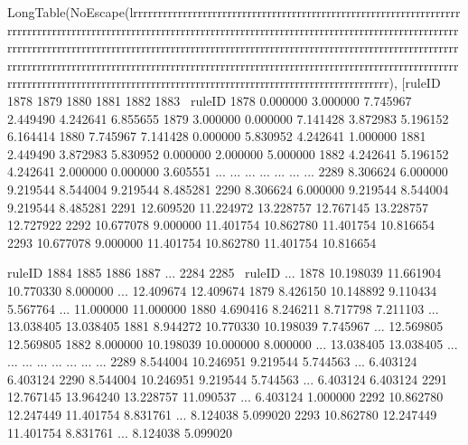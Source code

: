 LongTable(NoEscape(lrrrrrrrrrrrrrrrrrrrrrrrrrrrrrrrrrrrrrrrrrrrrrrrrrrrrrrrrrrrrrrrrrrrrrrrrrrrrrrrrrrrrrrrrrrrrrrrrrrrrrrrrrrrrrrrrrrrrrrrrrrrrrrrrrrrrrrrrrrrrrrrrrrrrrrrrrrrrrrrrrrrrrrrrrrrrrrrrrrrrrrrrrrrrrrrrrrrrrrrrrrrrrrrrrrrrrrrrrrrrrrrrrrrrrrrrrrrrrrrrrrrrrrrrrrrrrrrrrrrrrrrrrrrrrrrrrrrrrrrrrrrrrrrrrrrrrrrrrrrrrrrrrrrrrrrrrrrrrrrrrrrrrrrrrrrrrrrrrrrrrrrrrrrrrrrrrrrrrrrrrrrrrrrrrrrrrrrrrrrrrrrrrrrrrrrrrrrrrrrrrrrrrrrrrrrrrrrr), [ruleID       1878       1879       1880       1881       1882       1883  \
ruleID                                                                     
1878     0.000000   3.000000   7.745967   2.449490   4.242641   6.855655   
1879     3.000000   0.000000   7.141428   3.872983   5.196152   6.164414   
1880     7.745967   7.141428   0.000000   5.830952   4.242641   1.000000   
1881     2.449490   3.872983   5.830952   0.000000   2.000000   5.000000   
1882     4.242641   5.196152   4.242641   2.000000   0.000000   3.605551   
...           ...        ...        ...        ...        ...        ...   
2289     8.306624   6.000000   9.219544   8.544004   9.219544   8.485281   
2290     8.306624   6.000000   9.219544   8.544004   9.219544   8.485281   
2291    12.609520  11.224972  13.228757  12.767145  13.228757  12.727922   
2292    10.677078   9.000000  11.401754  10.862780  11.401754  10.816654   
2293    10.677078   9.000000  11.401754  10.862780  11.401754  10.816654   

ruleID       1884       1885       1886       1887  ...       2284       2285  \
ruleID                                              ...                         
1878    10.198039  11.661904  10.770330   8.000000  ...  12.409674  12.409674   
1879     8.426150  10.148892   9.110434   5.567764  ...  11.000000  11.000000   
1880     4.690416   8.246211   8.717798   7.211103  ...  13.038405  13.038405   
1881     8.944272  10.770330  10.198039   7.745967  ...  12.569805  12.569805   
1882     8.000000  10.198039  10.000000   8.000000  ...  13.038405  13.038405   
...           ...        ...        ...        ...  ...        ...        ...   
2289     8.544004  10.246951   9.219544   5.744563  ...   6.403124   6.403124   
2290     8.544004  10.246951   9.219544   5.744563  ...   6.403124   6.403124   
2291    12.767145  13.964240  13.228757  11.090537  ...   6.403124   1.000000   
2292    10.862780  12.247449  11.401754   8.831761  ...   8.124038   5.099020   
2293    10.862780  12.247449  11.401754   8.831761  ...   8.124038   5.099020   

